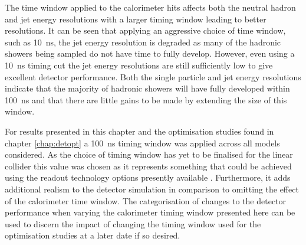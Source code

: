 The time window applied to the calorimeter hits affects both the neutral hadron and jet energy resolutions with a larger timing window leading to better resolutions.  It can be seen that applying an aggressive choice of time window, such as 10~ns, the jet energy resolution is degraded as many of the hadronic showers being sampled do not have time to fully develop.  However, even using a 10~ns timing cut the jet energy resolutions are still sufficiently low to give excellent detector performance.  Both the single particle and jet energy resolutions indicate that the majority of hadronic showers will have fully developed within 100~ns and that there are little gains to be made by extending the size of this window.  

For results presented in this chapter and the optimisation studies found in chapter \ref{chap:detopt} a 100~ns timing window was applied across all models considered.  As the choice of timing window has yet to be finalised for the linear collider this value was chosen as it represents something that could be achieved using the readout technology options presently available \cite{Adloff:2014rya}.  Furthermore, it adds additional realism to the detector simulation in comparison to omitting the effect of the calorimeter time window.  The categorisation of changes to the detector performance when varying the calorimeter timing window presented here can be used to discern the impact of changing the timing window used for the optimisation studies at a later date if so desired.  

